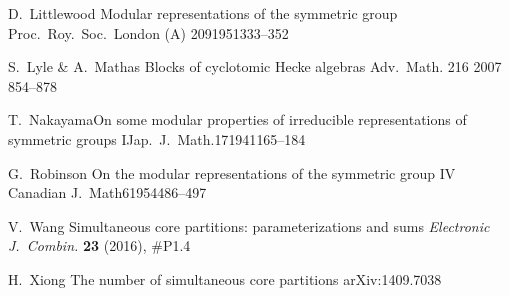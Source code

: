 \documentclass[a4paper, 11pt, twoside]{article}
\begin{document}
\begin{thebibliography}{99}
{D.\ Littlewood}
{Modular representations of the symmetric group}
{Proc.\ Roy.\ Soc.\ London (A)}
{209}{1951}{333--352}

{S.\ Lyle \& A.\ Mathas}
{Blocks of cyclotomic Hecke algebras}
{Adv.\ Math.}
{216}
{2007}
{854--878}

{T.\ Nakayama}{On some modular properties of irreducible representations of symmetric groups I}{Jap.\ J.\ Math.}{17}{1941}{165--184}

{G.~Robinson}
{On the modular representations of the symmetric group IV}
{Canadian J.\ Math}6{1954}{486--497}

{V.~Wang}
{Simultaneous core partitions: parameterizations and sums}
{\textit{Electronic J.\ Combin.} \textbf{23} (2016), \#P1.4}

{H.~Xiong}
{The number of simultaneous core partitions}
{arXiv:1409.7038}

\end{thebibliography}
\end{document}
